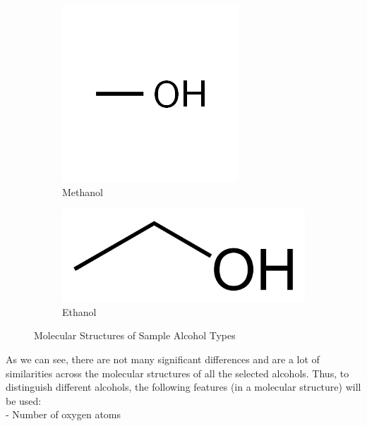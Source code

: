 \begin{figure}[h!]
\begin{subfigure}[b]{0.3\linewidth}
        \includegraphics[width=\linewidth]{meth.png}
        \caption{Methanol}
      \end{subfigure}
      \begin{subfigure}[b]{0.3\linewidth}
        \includegraphics[width=\linewidth]{ethanol.png}
        \caption{Ethanol}
      \end{subfigure}
    \caption{ Molecular Structures of Sample Alcohol Types}
    \label{fig:mol}
\end{figure}
As we can see, there are not many significant differences and are a lot of 
similarities across the molecular structures of all the selected alcohols. 
Thus, to distinguish different alcohols, the following features (in a 
molecular structure) will be used:\\
- Number of oxygen atoms\\
